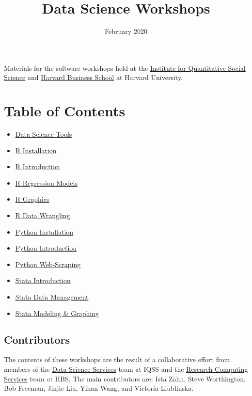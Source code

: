 \documentclass[
]{book}
\title{Data Science Workshops}
\author{}
\date{\vspace{-2.5em}February 2020}
\providecommand{\tightlist}{%
  \setlength{\itemsep}{0pt}\setlength{\parskip}{0pt}}
\begin{document}
\frontmatter
\maketitle

{
\setcounter{tocdepth}{1}
\tableofcontents
}
\mainmatter
Materials for the software workshops held at the \href{http://dss.iq.harvard.edu/}{Institute for Quantitative Social Science} and \href{https://training.rcs.hbs.org}{Harvard Business School} at Harvard University.

\hypertarget{table-of-contents}{%
\chapter*{Table of Contents}\label{table-of-contents}}

\begin{itemize}
\tightlist
\item
  \href{./DataScienceTools.html}{Data Science Tools}
\item
  \href{./Rinstall.html}{R Installation}
\item
  \href{./Rintro.html}{R Introduction}
\item
  \href{./Rmodels.html}{R Regression Models}
\item
  \href{./Rgraphics.html}{R Graphics}
\item
  \href{./RDataWrangling.html}{R Data Wrangling}
\item
  \href{./PythonInstall.html}{Python Installation}
\item
  \href{./PythonIntro.html}{Python Introduction}
\item
  \href{./PythonWebScrape.html}{Python Web-Scraping}
\item
  \href{./StataIntro.html}{Stata Introduction}
\item
  \href{./StataDatMan.html}{Stata Data Management}
\item
  \href{./StataModGraph.html}{Stata Modeling \& Graphing}
\end{itemize}

\hypertarget{contributors}{%
\section*{Contributors}\label{contributors}}

The contents of these workshops are the result of a collaborative effort from members of the \href{http://dss.iq.harvard.edu}{Data Science Services} team at IQSS and the \href{https://training.rcs.hbs.org}{Research Computing Services} team at HBS. The main contributors are: Ista Zahn, Steve Worthington, Bob Freeman, Jinjie Liu, Yihan Wang, and Victoria Liublinska.
\end{document}
